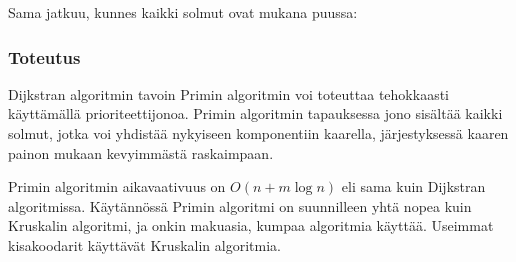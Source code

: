 \begin{samepage}
Sama jatkuu, kunnes kaikki solmut ovat mukana puussa:
\begin{center}
\end{center}
\end{samepage}

\subsubsection{Toteutus}

Dijkstran algoritmin tavoin Primin algoritmin voi toteuttaa
tehokkaasti käyttämällä prioriteettijonoa.
Primin algoritmin tapauksessa jono sisältää kaikki solmut,
jotka voi yhdistää nykyiseen komponentiin kaarella,
järjestyksessä kaaren painon mukaan kevyimmästä raskaimpaan.

Primin algoritmin aikavaativuus on $O(n + m \log n)$
eli sama kuin Dijkstran algoritmissa.
Käytännössä Primin algoritmi on suunnilleen
yhtä nopea kuin Kruskalin algoritmi,
ja onkin makuasia, kumpaa algoritmia käyttää.
Useimmat kisakoodarit käyttävät Kruskalin algoritmia.
